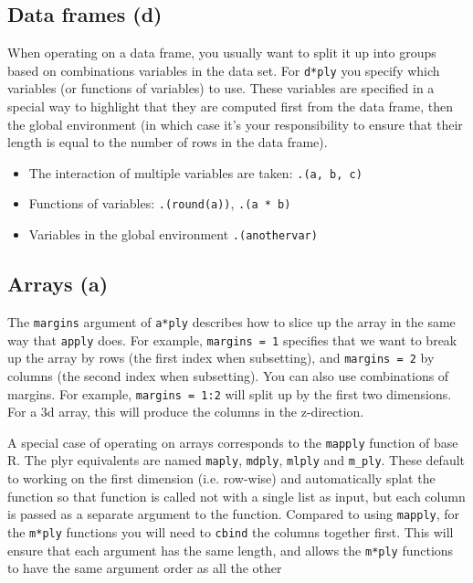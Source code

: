 \documentclass[letterpaper,oneside]{scrartcl}
\begin{document}
\subsection{Data frames (d)}

When operating on a data frame, you usually want to split it up into groups based on combinations variables in the data set.  For {\tt d*ply} you specify   which variables (or functions of variables) to use.  These variables are specified in a special way to highlight that they are computed first from the data frame, then the global environment (in which case it's your responsibility to ensure that their length is equal to the number of rows in the data frame).  

\begin{itemize}
  \item The interaction of multiple variables are taken: {\tt .(a, b, c)}
  \item Functions of variables: {\tt .(round(a))}, {\tt .(a * b)}
  \item Variables in the global environment {\tt .(anothervar)}
\end{itemize}

\subsection{Arrays (a)}

The {\tt margins} argument of {\tt a*ply} describes how to slice up the array in the same way that {\tt apply} does.  For example, {\tt margins = 1} specifies that we want to break up the array by rows (the first index when subsetting), and {\tt margins = 2} by columns (the second index when subsetting).  You can also use combinations of margins.  For example, {\tt margins = 1:2} will split up by the first two dimensions.  For a 3d array, this will produce the columns in the z-direction.

A special case of operating on arrays corresponds to the {\tt mapply} function of base R.  The plyr equivalents are named {\tt maply}, {\tt mdply}, {\tt mlply} and {\tt m\_ply}.  These default to working on the first dimension (i.e. row-wise) and automatically splat the function so that function is called not with a single list as input, but each column is passed as a separate argument to the function.  Compared to using {\tt mapply}, for the {\tt m*ply} functions you will need to {\tt cbind} the columns together first.  This will ensure that each argument has the same length, and allows the {\tt m*ply} functions to have the same argument order as all the other 
\end{document}
